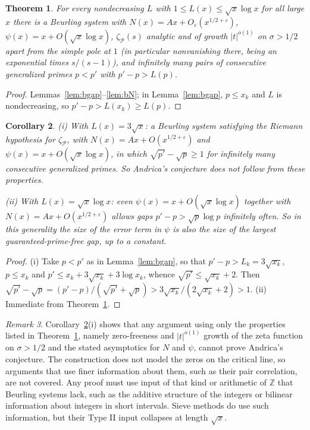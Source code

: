 \documentclass[11pt]{amsart}
\newtheorem{theorem}{Theorem}[section]
\newtheorem{corollary}[theorem]{Corollary}
\theoremstyle{definition}
\theoremstyle{remark}
\newtheorem{remark}[theorem]{Remark}
\begin{document}
\begin{theorem}\label{thm:beurling}
For every nondecreasing $L$ with $1\le L(x)\le\sqrt x\log x$ for all large $x$ there is a Beurling system with $N(x)=Ax+O_\varepsilon(x^{1/2+\varepsilon})$, $\psi(x)=x+O(\sqrt x\log x)$, $\zeta_{\mathcal P}(s)$ analytic and of growth $|t|^{o(1)}$ on $\sigma>1/2$ apart from the simple pole at $1$ (in particular nonvanishing there, being an exponential times $s/(s-1)$), and infinitely many pairs of consecutive generalized primes $p<p'$ with $p'-p>L(p)$.
\end{theorem}
\begin{proof}
Lemmas~\ref{lem:bgap}--\ref{lem:bN}; in Lemma~\ref{lem:bgap}, $p\le x_k$ and $L$ is nondecreasing, so $p'-p>L(x_k)\ge L(p)$.
\end{proof}

\begin{corollary}\label{cor:beurling}
(i) With $L(x)=3\sqrt x$: a Beurling system satisfying the Riemann hypothesis for $\zeta_{\mathcal P}$, with $N(x)=Ax+O(x^{1/2+\varepsilon})$ and $\psi(x)=x+O(\sqrt x\log x)$, in which $\sqrt{p'}-\sqrt p\ge 1$ for infinitely many consecutive generalized primes. So Andrica's conjecture does not follow from these properties.

(ii) With $L(x)=\sqrt x\log x$: even $\psi(x)=x+O(\sqrt x\log x)$ together with $N(x)=Ax+O(x^{1/2+\varepsilon})$ allows gaps $p'-p>\sqrt p\log p$ infinitely often. So in this generality the size of the error term in $\psi$ is also the size of the largest guaranteed-prime-free gap, up to a constant.
\end{corollary}
\begin{proof}
(i) Take $p<p'$ as in Lemma~\ref{lem:bgap}, so that $p'-p>L_k=3\sqrt{x_k}$, $p\le x_k$ and $p'\le x_k+3\sqrt{x_k}+3\log x_k$, whence $\sqrt{p'}\le\sqrt{x_k}+2$. Then $\sqrt{p'}-\sqrt p=(p'-p)/(\sqrt{p'}+\sqrt p)>3\sqrt{x_k}/(2\sqrt{x_k}+2)>1$. (ii) Immediate from Theorem~\ref{thm:beurling}.
\end{proof}

\begin{remark}
Corollary~\ref{cor:beurling}(i) shows that any argument using only the properties listed in Theorem~\ref{thm:beurling}, namely zero-freeness and $|t|^{o(1)}$ growth of the zeta function on $\sigma>1/2$ and the stated asymptotics for $N$ and $\psi$, cannot prove Andrica's conjecture. The construction does not model the zeros on the critical line, so arguments that use finer information about them, such as their pair correlation, are not covered. Any proof must use input of that kind or arithmetic of $\mathbb Z$ that Beurling systems lack, such as the additive structure of the integers or bilinear information about integers in short intervals. Sieve methods do use such information, but their Type II input collapses at length $\sqrt x$.
\end{remark}
\end{document}
